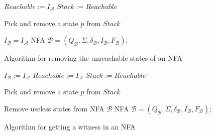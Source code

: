 \begin{figure}[h!]
\begin{algorithm}[H]
	\label{algRemove}

  $Reachable := I_\mathcal{A}$\;
  $Stack := Reachable$\;
	
   {
			Pick and remove a state $p$ from $Stack$\;
	 }

  $I_{\mathcal{B}} = I_{\mathcal{A}}$\;
	\Return NFA $\mathcal{B}=(Q_\mathcal{B},\Sigma,\delta_\mathcal{B},I_\mathcal{B},F_\mathcal{B})$;
	\caption{Algorithm for removing the unreachable states of an NFA}
\end{algorithm}
\begin{algorithm}[H]
	\label{algCandidate}


  $I_\mathcal{B} := I_\mathcal{A}$\;
  $Reachable := I_\mathcal{A}$\;
  $Stack := Reachable$\;
	
   {
			Pick and remove a state $p$ from $Stack$\;
	}

  Remove useless states from NFA $\mathcal{B}$
	\Return NFA $\mathcal{B}=(Q_\mathcal{B},\Sigma,\delta_\mathcal{B},I_\mathcal{B},F_\mathcal{B})$;
	\caption{Algorithm for getting a witness in an NFA}
\end{algorithm}


\end{figure}

